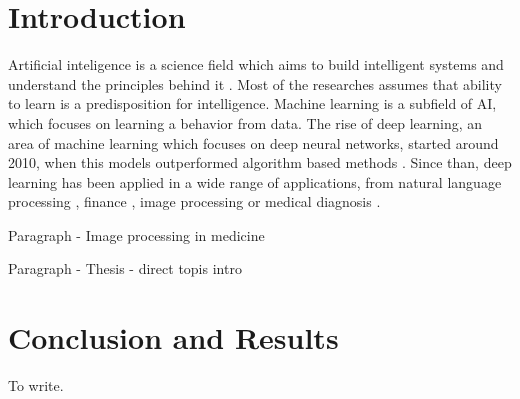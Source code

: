 \documentclass[twoside]{ctuthesis}
\theoremstyle{plain}
\theoremstyle{definition}
\theoremstyle{note}
\begin{document}
\maketitle


\chapter{Introduction}
Artificial inteligence is a science field which aims to build intelligent systems
and understand the principles behind it \cite{AIMAbook}. Most of the researches
assumes that ability to learn is a predisposition for intelligence. \cite{KONONENKO200189}
Machine learning is a subfield of AI, which focuses on learning a behavior from data.
The rise of deep learning, an area of machine learning which focuses on deep neural networks,
started around 2010, when this models outperformed algorithm based methods \cite{DL_BOOK}. 
Since than, deep learning has been applied in a wide range of applications, 
from natural language processing \cite{mikolov2013efficient}, finance \cite{Ding2015DeepLF}, 
image processing \cite{AlexNet} or medical diagnosis \cite{6868045}.

Paragraph - Image processing in medicine

Paragraph - Thesis - direct topis intro








\chapter{Conclusion and Results}
To write.


\appendix
\end{document}
